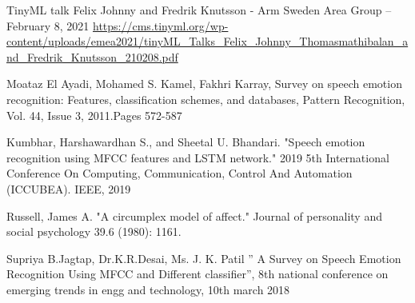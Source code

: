 \begin{thebibliography}{00}
TinyML talk Felix Johnny and Fredrik Knutsson - Arm Sweden Area Group – February 8, 2021
\url{https://cms.tinyml.org/wp-content/uploads/emea2021/tinyML_Talks_Felix_Johnny_Thomasmathibalan_and_Fredrik_Knutsson_210208.pdf}

Moataz El Ayadi, Mohamed S. Kamel, Fakhri Karray, Survey on speech emotion recognition: Features, classification schemes, and databases, Pattern Recognition, Vol. 44, Issue 3, 2011.Pages 572-587

Kumbhar, Harshawardhan S., and Sheetal U. Bhandari. "Speech emotion recognition using MFCC features and LSTM network." 2019 5th International Conference On Computing, Communication, Control And Automation (ICCUBEA). IEEE, 2019

Russell, James A. "A circumplex model of affect." Journal of personality and social psychology 39.6 (1980): 1161.

Supriya B.Jagtap, Dr.K.R.Desai, Ms. J. K. Patil ” A Survey on Speech Emotion Recognition Using MFCC and Different classifier”, 8th national conference on emerging trends in engg and technology, 10th march 2018

\end{thebibliography}